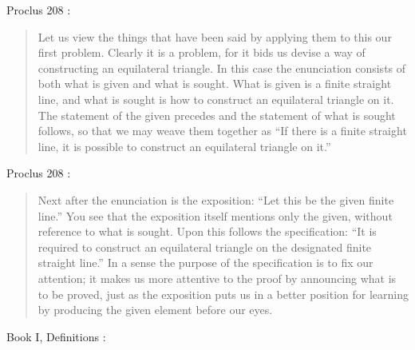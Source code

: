\documentclass{article}
\begin{document}
Proclus 208 \cite[pp.~162--163]{proclus}:

\begin{quote}
Let us view the things that have been said by applying
them to this our first problem. Clearly it is a problem, for it
bids us  devise a way of constructing an equilateral triangle.
In this case the enunciation consists of both what is given and
what is sought. What is given is a finite straight line, and what
is sought is how to construct an equilateral triangle on it. The
statement of the given precedes and the statement of what is
sought follows, so that we may weave them together as ``If
there is a finite straight line, it is possible to construct an
equilateral triangle on it.''
\end{quote}

Proclus 208 \cite[p.~163]{proclus}:

\begin{quote}
Next after the enunciation is the exposition: ``Let this be
the given finite line.'' You see that the exposition itself mentions
only the given, without reference to what is sought.
Upon this follows the specification: ``It is required to construct
an equilateral triangle on the designated finite straight
line.''  In a sense the purpose of the specification is to fix our
attention; it makes us more attentive to the proof by announcing
what is to be proved, just as the exposition puts us in
a better position for learning by producing the given element
before our eyes.
\end{quote}

Book I, Definitions \cite[pp.~153--154]{euclidI}:
\end{document}
